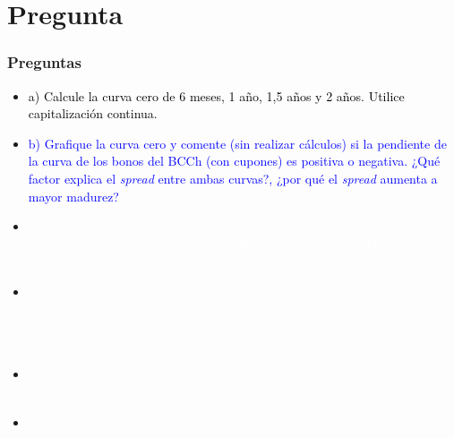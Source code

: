 \documentclass{beamer}
\begin{document}
\section{Pregunta }
\begin{frame}
  \frametitle{Preguntas}
  \begin{itemize}
    \scriptsize
    \item {\textcolor{black}{a) Calcule la curva cero de 6 meses, 1 año, 1,5 años y 2 años. Utilice capitalización continua.}}
    \vspace{3pt}
    \item {\Large\textcolor{blue}{b) Grafique la curva cero y comente (sin realizar cálculos) si la pendiente de la curva de los bonos del BCCh (con cupones) es positiva o negativa. ¿Qué factor explica el \textit{spread} entre ambas curvas?, ¿por qué el \textit{spread} aumenta a mayor madurez?}}
    \vspace{3pt}
    \item {\textcolor{white}{c) Comente cuál es la interpretación económica detrás de la pendiente observada en la curva cero. ¿Qué nos dice respecto a la probabilidad de recesión?}}
    \vspace{3pt}
    \item {\textcolor{white}{d) Considerando que usted tiene la información de la curva cero, la curva \textit{forward} y la curva de las \textit{yields} de los bonos de gobierno. Señale qué curva usaría para calcular el valor presente de las ganancias o pérdidas de los contratos \textit{forward}.}}
    \vspace{3pt}
    \item {\textcolor{white}{e) ¿Cuál es el rol de las probabilidades neutrales al riesgo en d)?, ¿qué rol juega la condición de no arbitraje?}}
    \vspace{3pt}
    \item {\textcolor{white}{f) Calcule el punto a) utilizando matrices en Excel/R/Phyton.}}
    \vspace{3pt}
  \end{itemize}
\end{frame}
\end{document}
